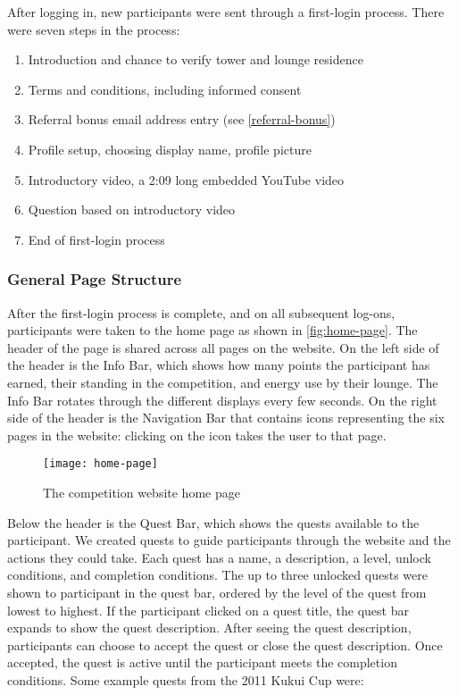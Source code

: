 After logging in, new participants were sent through a first-login process. There were seven steps in the process:

\begin{enumerate}
	\item Introduction and chance to verify tower and lounge residence
	\item Terms and conditions, including informed consent
	\item Referral bonus email address entry (see \autoref{referral-bonus})
	\item Profile setup, choosing display name, profile picture
	\item Introductory video, a 2:09 long embedded YouTube video
	\item Question based on introductory video
	\item End of first-login process
\end{enumerate}


\subsubsection{General Page Structure}

After the first-login process is complete, and on all subsequent log-ons, participants were taken to the home page as shown in \autoref{fig:home-page}. The header of the page is shared across all pages on the website. On the left side of the header is the Info Bar, which shows how many points the participant has earned, their standing in the competition, and energy use by their lounge. The Info Bar rotates through the different displays every few seconds. On the right side of the header is the Navigation Bar that contains icons representing the six pages in the website: clicking on the icon takes the user to that page.

\begin{figure}[htbp]
	\centering
		\texttt{[image: home-page]}
		\caption{The competition website home page}
\label{fig:home-page}
\end{figure}

Below the header is the Quest Bar, which shows the quests available to the participant. We created quests to guide participants through the website and the actions they could take. Each quest has a name, a description, a level, unlock conditions, and completion conditions. The up to three unlocked quests were shown  to participant in the quest bar, ordered by the level of the quest from lowest to highest. If the participant clicked on a quest title, the quest bar expands to show the quest description. After seeing the quest description, participants can choose to accept the quest or close the quest description. Once accepted, the quest is active until the participant meets the completion conditions. Some example quests from the 2011 Kukui Cup were:

